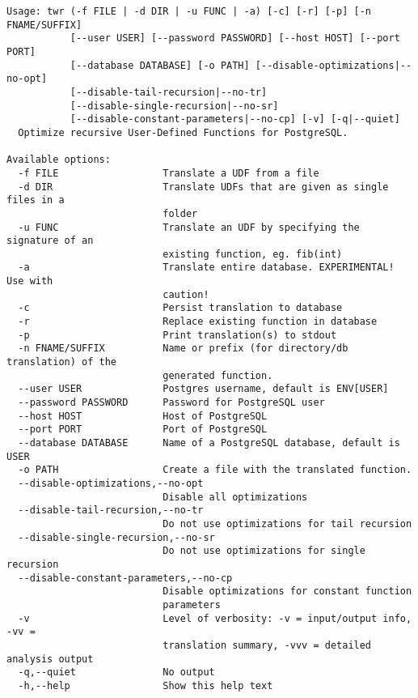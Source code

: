 \footnotesize
\begin{verbatim}
Usage: twr (-f FILE | -d DIR | -u FUNC | -a) [-c] [-r] [-p] [-n FNAME/SUFFIX]
           [--user USER] [--password PASSWORD] [--host HOST] [--port PORT]
           [--database DATABASE] [-o PATH] [--disable-optimizations|--no-opt]
           [--disable-tail-recursion|--no-tr]
           [--disable-single-recursion|--no-sr]
           [--disable-constant-parameters|--no-cp] [-v] [-q|--quiet]
  Optimize recursive User-Defined Functions for PostgreSQL.

Available options:
  -f FILE                  Translate a UDF from a file
  -d DIR                   Translate UDFs that are given as single files in a
                           folder
  -u FUNC                  Translate an UDF by specifying the signature of an
                           existing function, eg. fib(int)
  -a                       Translate entire database. EXPERIMENTAL! Use with
                           caution!
  -c                       Persist translation to database
  -r                       Replace existing function in database
  -p                       Print translation(s) to stdout
  -n FNAME/SUFFIX          Name or prefix (for directory/db translation) of the
                           generated function.
  --user USER              Postgres username, default is ENV[USER]
  --password PASSWORD      Password for PostgreSQL user
  --host HOST              Host of PostgreSQL
  --port PORT              Port of PostgreSQL
  --database DATABASE      Name of a PostgreSQL database, default is USER
  -o PATH                  Create a file with the translated function.
  --disable-optimizations,--no-opt
                           Disable all optimizations
  --disable-tail-recursion,--no-tr
                           Do not use optimizations for tail recursion
  --disable-single-recursion,--no-sr
                           Do not use optimizations for single recursion
  --disable-constant-parameters,--no-cp
                           Disable optimizations for constant function
                           parameters
  -v                       Level of verbosity: -v = input/output info, -vv =
                           translation summary, -vvv = detailed analysis output
  -q,--quiet               No output
  -h,--help                Show this help text
\end{verbatim}